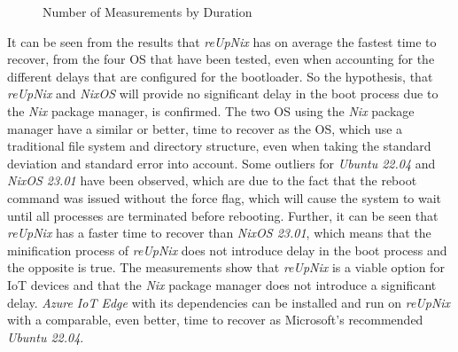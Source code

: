 \begin{figure}[H]
\caption{Number of Measurements by Duration}
\label{fig:timetorecover}
\end{figure}
\noindent
It can be seen from the results that \textit{reUpNix} has on average the fastest time
to recover, from the four \ac{OS} that have been tested, even when accounting for the different
delays that are configured for the bootloader. So the hypothesis, that \textit{reUpNix}
and \textit{NixOS} will provide no significant delay in the boot process due to
the \textit{Nix} package manager, is confirmed. The two \ac{OS} using the
\textit{Nix} package manager have a similar or better, time to recover as the \ac{OS},
which use a traditional file system and directory structure, even when taking
the standard deviation and standard error into account. Some outliers
for \textit{Ubuntu 22.04} and \textit{NixOS 23.01} have been observed, which are due to the
fact that the reboot command was issued without the force flag, which will cause
the system to wait until all processes are terminated before rebooting. Further,
it can be seen that \textit{reUpNix} has a faster time to recover than \textit{NixOS 23.01},
which means that the minification process of \textit{reUpNix} does not introduce
delay in the boot process and the opposite is true.
The measurements show that \textit{reUpNix} is a viable option for \ac{IoT} devices
and that the \textit{Nix} package manager does not introduce a significant delay.
\textit{Azure IoT Edge} with its dependencies can be installed and run on
\textit{reUpNix} with a comparable, even better, time to recover as Microsoft's
recommended \textit{Ubuntu 22.04}.



